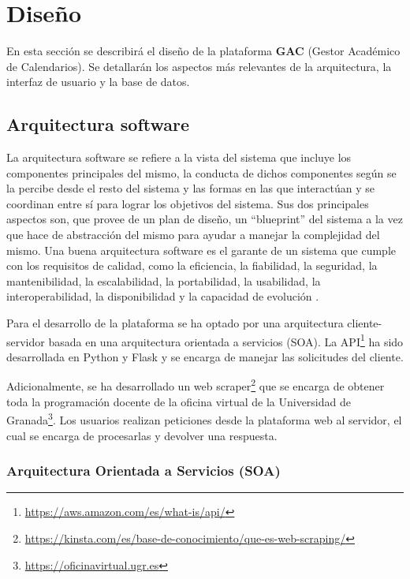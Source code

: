 \chapter{Diseño}
En esta sección se describirá el diseño de la plataforma \textbf{GAC} (Gestor Académico de Calendarios). Se detallarán los aspectos más relevantes de la arquitectura, la interfaz de usuario y la base de datos.

\newpage

\section{Arquitectura software}
La arquitectura software se refiere a la vista del sistema que incluye los componentes principales del mismo, la conducta de dichos componentes según se la percibe desde el resto del sistema y las formas en las que interactúan y se coordinan entre sí para lograr los objetivos del sistema. Sus dos principales aspectos son, que provee de un plan de diseño, un ``blueprint'' del sistema a la vez que hace de abstracción del mismo para ayudar a manejar la complejidad del mismo. Una buena arquitectura software es el garante de un sistema que cumple con los requisitos de calidad, como la eficiencia, la fiabilidad, la seguridad, la mantenibilidad, la escalabilidad, la portabilidad, la usabilidad, la interoperabilidad, la disponibilidad y la capacidad de evolución \cite{hofmeister2000applied, reynoso2004introduccion, garlan2008software}.\newline

Para el desarrollo de la plataforma se ha optado por una arquitectura cliente-servidor basada en una arquitectura orientada a servicios (SOA). La API\footnote{\url{https://aws.amazon.com/es/what-is/api/}} ha sido desarrollada en Python y Flask y se encarga de manejar las solicitudes del cliente.\newline

Adicionalmente, se ha desarrollado un web scraper\footnote{\url{https://kinsta.com/es/base-de-conocimiento/que-es-web-scraping/}} que se encarga de obtener toda la programación docente de la oficina virtual de la Universidad de Granada\footnote{\url{https://oficinavirtual.ugr.es}}. Los usuarios realizan peticiones desde la plataforma web al servidor, el cual se encarga de procesarlas y devolver una respuesta.\newline

\subsection{Arquitectura Orientada a Servicios (SOA)}

